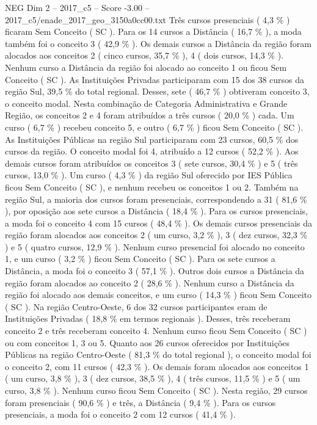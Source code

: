 \begin{textsample}{NEG Dim 2 – 2017\_c5 – Score -3.00 – 2017\_c5/enade\_2017\_geo\_3150a0cc00.txt}
Três cursos presenciais ( 4,3 \% ) ficaram Sem Conceito ( SC ).
Para os 14 cursos a Distância ( 16,7 \% ), a moda também foi o conceito 3 ( 42,9 \% ).
Os demais cursos a Distância da região foram alocados aos conceitos 2 ( cinco cursos, 35,7 \% ), 4 ( dois cursos, 14,3 \% ).
Nenhum curso a Distância da região foi alocado ao conceito 1 ou ficou Sem Conceito ( SC ).
As Instituições Privadas participaram com 15 dos 38 cursos da região Sul, 39,5 \% do total regional.
Desses, sete ( 46,7 \% ) obtiveram conceito 3, o conceito modal.
Nesta combinação de Categoria Administrativa e Grande Região, os conceitos 2 e 4 foram atribuídos a três cursos ( 20,0 \% ) cada.
Um curso ( 6,7 \% ) recebeu conceito 5, e outro ( 6,7 \% ) ficou Sem Conceito ( SC ).
As Instituições Públicas na região Sul participaram com 23 cursos, 60,5 \% dos cursos da região.
O conceito modal foi 4, atribuído a 12 cursos ( 52,2 \% ).
Aos demais cursos foram atribuídos os conceitos 3 ( sete cursos, 30,4 \% ) e 5 ( três cursos, 13,0 \% ).
Um curso ( 4,3 \% ) da região Sul oferecido por IES Pública ficou Sem Conceito ( SC ), e nenhum recebeu os conceitos 1 ou 2.
Também na região Sul, a maioria dos cursos foram presenciais, correspondendo a 31 ( 81,6 \% ), por oposição aos sete cursos a Distância ( 18,4 \% ).
Para os cursos presenciais, a moda foi o conceito 4 com 15 cursos ( 48,4 \% ).
Os demais cursos presenciais da região foram alocados aos conceitos 2 ( um curso, 3,2 \% ), 3 ( dez cursos, 32,3 \% ) e 5 ( quatro cursos, 12,9 \% ).
Nenhum curso presencial foi alocado no conceito 1, e um curso ( 3,2 \% ) ficou Sem Conceito ( SC ).
Para os sete cursos a Distância, a moda foi o conceito 3 ( 57,1 \% ).
Outros dois cursos a Distância da região foram alocados ao conceito 2 ( 28,6 \% ).
Nenhum curso a Distância da região foi alocado aos demais conceitos, e um curso ( 14,3 \% ) ficou Sem Conceito ( SC ).
Na região Centro-Oeste, 6 dos 32 cursos participantes eram de Instituições Privadas ( 18,8 \% em termos regionais ).
Desses, três receberam conceito 2 e três receberam conceito 4.
Nenhum curso ficou Sem Conceito ( SC ) ou com conceitos 1, 3 ou 5.
Quanto aos 26 cursos oferecidos por Instituições Públicas na região Centro-Oeste ( 81,3 \% do total regional ), o conceito modal foi o conceito 2, com 11 cursos ( 42,3 \% ).
Os demais foram alocados aos conceitos 1 ( um curso, 3,8 \% ), 3 ( dez cursos, 38,5 \% ), 4 ( três cursos, 11,5 \% ) e 5 ( um curso, 3,8 \% ).
Nenhum curso ficou Sem Conceito ( SC ).
Nesta região, 29 cursos foram presenciais ( 90,6 \% ) e três, a Distância ( 9,4 \% ).
Para os cursos presenciais, a moda foi o conceito 2 com 12 cursos ( 41,4 \% ).

\end{textsample}
